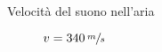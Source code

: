 \documentclass[a4paper,11pt,italian]{article}
\begin{document}
\begin{description}
%
  \item[Velocità del suono nell'aria] $ v = 340 \, \sfrac{m}{s} $



%
%
%   
%
  
%   
  
\end{description}
\end{document}

